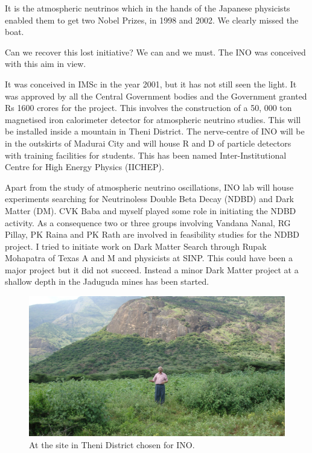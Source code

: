 It is the atmospheric neutrinos which in the hands of the Japanese 
physicists enabled them to get two Nobel Prizes, in 1998 and 2002. We 
clearly missed the boat.
\medskip

Can we recover this lost initiative? We can and we must. The INO was 
conceived with this aim in view.
\medskip

It was conceived in IMSc in the year 2001, but it has not still seen the 
light. It was approved by all the Central Government bodies and the 
Government granted Rs 1600 crores for the project. This involves the 
construction of a 50, 000 ton magnetised iron calorimeter detector for 
atmospheric neutrino studies. This will be installed inside a mountain 
in Theni District. The nerve-centre of INO will be in the outskirts of 
Madurai City and will house R and D of particle detectors with training 
facilities for students. This has been named Inter-Institutional Centre 
for High Energy Physics (IICHEP).
\medskip

Apart from the study of atmospheric neutrino oscillations, INO lab will 
house experiments searching for Neutrinoless Double Beta Decay (NDBD) 
and Dark Matter (DM). CVK Baba and myself played some role in initiating 
the NDBD activity. As a consequence two or three groups involving 
Vandana Nanal, RG Pillay, PK Raina and PK Rath are involved in 
feasibility studies for the NDBD project. I tried to initiate work on 
Dark Matter Search through Rupak Mohapatra of Texas A and M and 
physicists at SINP. This could have been a major project but it did not 
succeed. Instead a minor Dark Matter project at a shallow depth in the 
Jaduguda mines has been started.
\medskip

\begin{figure}[h]
\centering
\includegraphics[width=\textwidth]{images/Rajaji-ino.jpg}
\caption{At the site in Theni District chosen for INO.}  
\end{figure}


